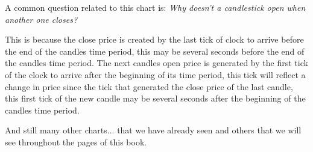 \begin{figure}[H]
	\end{figure}
	A common question related to this chart is: \textit{Why doesn't a candlestick open when another one closes?}
	
	This is because the close price is created by the last tick of clock to arrive before the end of the candles time period, this may be several seconds before the end of the candles time period. The next candles open price is generated by the first tick of the clock to arrive after the beginning of its time period, this tick will reflect a change in price since the tick that generated the close price of the last candle, this first tick of the new candle may be several seconds after the beginning of the candles time period.
	
	And still many other charts... that we have already seen and others that we will see throughout the pages of this book.

